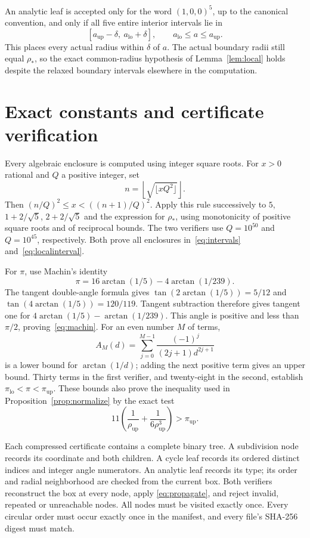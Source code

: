 \documentclass[11pt]{amsart}
\theoremstyle{definition}
\theoremstyle{remark}
\numberwithin{equation}{section}
\newcommand{\rhoopt}{\rho_*}
\newcommand{\pil}{\pi_{\mathrm{lo}}}
\newcommand{\piu}{\pi_{\mathrm{up}}}
\newcommand{\rhou}{\rho_{\mathrm{up}}}
\begin{document}
An analytic leaf is accepted only for the word $(1,0,0)^5$, up to the
canonical convention, and only if all five entire interior intervals lie in
\begin{equation}\label{eq:localinterval}
 [a_{\mathrm{up}}-\delta,\ a_{\mathrm{lo}}+\delta],
 \qquad a_{\mathrm{lo}}\leq a\leq a_{\mathrm{up}}.
\end{equation}
This places every actual radius within $\delta$ of $a$. The actual boundary
radii still equal $\rhoopt$, so the exact common-radius hypothesis of
Lemma~\ref{lem:local} holds despite the relaxed boundary intervals elsewhere
in the computation.

\section{Exact constants and certificate verification}\label{sec:constants}

Every algebraic enclosure is computed using integer square roots. For
$x>0$ rational and $Q$ a positive integer, set
\[
 n=\left\lfloor\sqrt{\lfloor xQ^2\rfloor}\right\rfloor.
\]
Then $(n/Q)^2\leq x<((n+1)/Q)^2$. Apply this rule successively to $5$,
$1+2/\sqrt5$, $2+2/\sqrt5$ and the expression for $\rhoopt$, using
monotonicity of positive square roots and of reciprocal bounds. The two
verifiers use $Q=10^{50}$ and $Q=10^{45}$, respectively. Both prove all
enclosures in~\eqref{eq:intervals} and~\eqref{eq:localinterval}.

For $\pi$, use Machin's identity
\begin{equation}\label{eq:machin}
 \pi=16\arctan(1/5)-4\arctan(1/239).
\end{equation}
The tangent double-angle formula gives
$\tan(2\arctan(1/5))=5/12$ and
$\tan(4\arctan(1/5))=120/119$. Tangent subtraction therefore gives tangent
one for $4\arctan(1/5)-\arctan(1/239)$. This angle is positive and less
than $\pi/2$, proving~\eqref{eq:machin}. For an even number $M$ of terms,
\[
 A_M(d)=\sum_{j=0}^{M-1}\frac{(-1)^j}{(2j+1)d^{2j+1}}
\]
is a lower bound for $\arctan(1/d)$; adding the next positive term gives an
upper bound. Thirty terms in the first verifier, and twenty-eight in the
second, establish $\pil<\pi<\piu$. These bounds also prove the inequality
used in Proposition~\ref{prop:normalize} by the exact test
\[
 11\left(\frac1{\rhou}+\frac1{6\rhou^3}\right)>\piu.
\]

Each compressed certificate contains a complete binary tree. A subdivision
node records its coordinate and both children. A cycle leaf records its
ordered distinct indices and integer angle numerators. An analytic leaf
records its type; its order and radial neighborhood are checked from the
current box. Both verifiers reconstruct the box at every node, apply
\eqref{eq:propagate}, and reject invalid, repeated or unreachable nodes.
All nodes must be visited exactly once. Every circular order must occur
exactly once in the manifest, and every file's SHA-256 digest must match.
\end{document}
